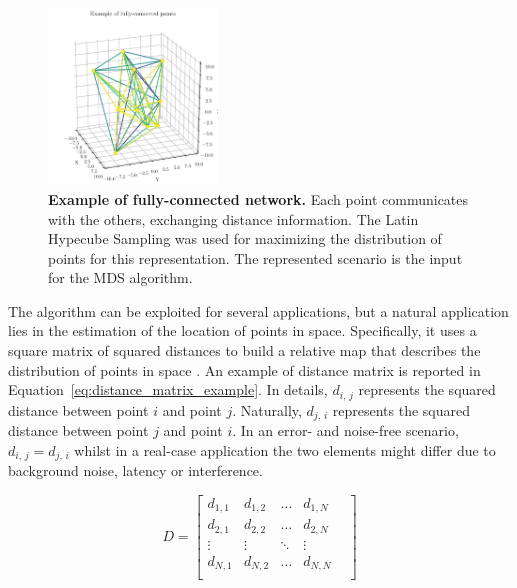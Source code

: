 \begin{figure}[!ht]
    \centering
    \includegraphics[width=0.4\textwidth]{figures/MDS_visualization.pdf}
    \caption[Example of fully-connected network.]{\textbf{Example of fully-connected network.} Each point communicates with the others, exchanging distance information. The Latin Hypecube Sampling was used for maximizing the distribution of points for this representation. The represented scenario is the input for the MDS algorithm.}
    \label{fig:MDS_visualization}
\end{figure}

The algorithm can be exploited for several applications, but a natural application lies in the estimation of the location of points in space. Specifically, it uses a square matrix of squared distances to build a relative map that describes the distribution of points in space  \cite{Li2021CooperativeNodes}. An example of distance matrix is reported in Equation~\ref{eq:distance_matrix_example}. In details, $d_{i,\,j}$ represents the squared distance between point $i$ and point $j$. Naturally, $d_{j,\,i}$ represents the squared distance between point $j$ and point $i$. In an error- and noise-free scenario, $d_{i,\,j} = d_{j,\,i}$ whilst in a real-case application the two elements might differ due to background noise, latency or interference. \par

\begin{equation}
    \label{eq:distance_matrix_example}
    D = 
    \begin{bmatrix}
    d_{1,1} & d_{1,2} & \dots & d_{1,N} \\
    d_{2,1} & d_{2,2} & \dots & d_{2,N} \\
    \vdots & \vdots & \ddots &  \vdots & \\
    d_{N,1} & d_{N,2} & \dots & d_{N,N} \\
    \end{bmatrix}
\end{equation}

